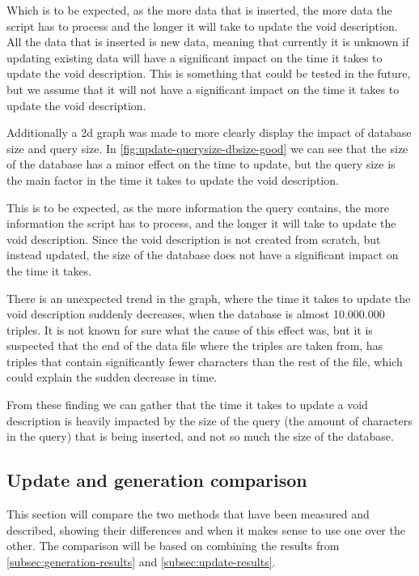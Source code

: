 Which is to be expected, as the more data that is inserted, the more data the script has to process and the longer it will take to update the \gls{void} description. All the data that is inserted is new data, meaning that currently it is unknown if updating existing data will have a significant impact on the time it takes to update the \gls{void} description. This is something that could be tested in the future, but we assume that it will not have a significant impact on the time it takes to update the \gls{void} description.

Additionally a 2d graph was made to more clearly display the impact of database size and query size. In \autoref{fig:update-querysize-dbsize-good} we can see that the size of the database has a minor effect on the time to update, but the query size is the main factor in the time it takes to update the \gls{void} description.

This is to be expected, as the more information the query contains, the more information the script has to process, and the longer it will take to update the \gls{void} description. Since the \gls{void} description is not created from scratch, but instead updated, the size of the database does not have a significant impact on the time it takes.

There is an unexpected trend in the graph, where the time it takes to update the \gls{void} description suddenly decreases, when the database is almost 10.000.000 triples. It is not known for sure what the cause of this effect was, but it is suspected that the end of the data file where the triples are taken from, has triples that contain significantly fewer characters than the rest of the file, which could explain the sudden decrease in time.

From these finding we can gather that the time it takes to update a \gls{void} description is heavily impacted by the size of the query (the amount of characters in the query) that is being inserted, and not so much the size of the database.


\subsection{Update and generation comparison}\label{subsec:update-generation-comparison}
This section will compare the two methods that have been measured and described, showing their differences and when it makes sense to use one over the other. The comparison will be based on combining the results from \autoref{subsec:generation-results} and \autoref{subsec:update-results}.

